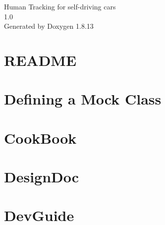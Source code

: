 \documentclass[twoside]{book}
\newcommand{\+}{\discretionary{\mbox{\scriptsize$\hookleftarrow$}}{}{}}
\newcommand{\clearemptydoublepage}{%
  \newpage{\pagestyle{empty}\cleardoublepage}%
}
\begin{document}
\hypersetup{pageanchor=false,
             bookmarksnumbered=true,
             pdfencoding=unicode
            }
\begin{titlepage}
\vspace*{7cm}
\begin{center}%
{\Large Human Tracking for self-\/driving cars \\[1ex]\large 1.\+0 }\\
\vspace*{1cm}
{\large Generated by Doxygen 1.8.13}\\
\end{center}
\end{titlepage}
\clearemptydoublepage
{}
\tableofcontents
\clearemptydoublepage
{}
\hypersetup{pageanchor=true}

\chapter{R\+E\+A\+D\+ME}
\label{md__r_e_a_d_m_e}

\chapter{Defining a Mock Class}
\label{md_vendor_googletest_googlemock_docs__cheat_sheet}

\chapter{Cook\+Book}
\label{md_vendor_googletest_googlemock_docs__cook_book}

\chapter{Design\+Doc}
\label{md_vendor_googletest_googlemock_docs__design_doc}

\chapter{Dev\+Guide}
\label{md_vendor_googletest_googlemock_docs__dev_guide}

\end{document}
